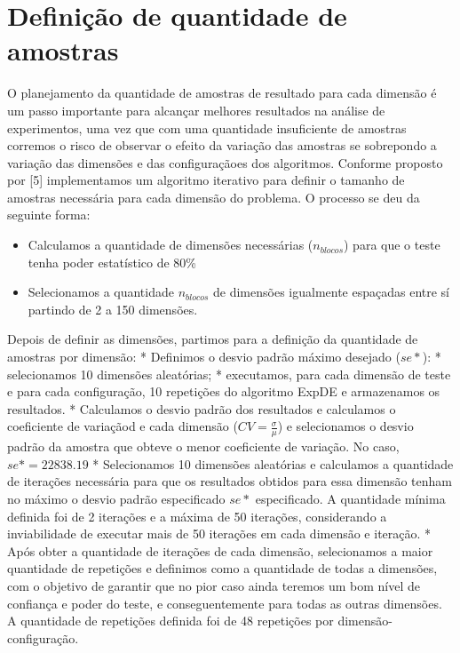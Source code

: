 \documentclass[
]{article}
\providecommand{\tightlist}{%
  \setlength{\itemsep}{0pt}\setlength{\parskip}{0pt}}
\begin{document}
\hypertarget{definiuxe7uxe3o-de-quantidade-de-amostras}{%
\section{Definição de quantidade de
amostras}\label{definiuxe7uxe3o-de-quantidade-de-amostras}}

O planejamento da quantidade de amostras de resultado para cada dimensão
é um passo importante para alcançar melhores resultados na análise de
experimentos, uma vez que com uma quantidade insuficiente de amostras
corremos o risco de observar o efeito da variação das amostras se
sobrepondo a variação das dimensões e das configuraçãoes dos algoritmos.
Conforme proposto por {[}5{]} implementamos um algoritmo iterativo para
definir o tamanho de amostras necessária para cada dimensão do problema.
O processo se deu da seguinte forma:

\begin{itemize}
\tightlist
\item
  Calculamos a quantidade de dimensões necessárias (\(n_{blocos}\)) para
  que o teste tenha poder estatístico de 80\%
\item
  Selecionamos a quantidade \(n_{blocos}\) de dimensões igualmente
  espaçadas entre sí partindo de 2 a 150 dimensões.
\end{itemize}

Depois de definir as dimensões, partimos para a definição da quantidade
de amostras por dimensão: * Definimos o desvio padrão máximo desejado
(\(se*\)): * selecionamos 10 dimensões aleatórias; * executamos, para
cada dimensão de teste e para cada configuração, 10 repetições do
algoritmo ExpDE e armazenamos os resultados. * Calculamos o desvio
padrão dos resultados e calculamos o coeficiente de variaçãod e cada
dimensão (\(CV = \frac{\sigma}{\mu}\)) e selecionamos o desvio padrão da
amostra que obteve o menor coeficiente de variação. No caso,
\(se*= 22838.19\) * Selecionamos 10 dimensões aleatórias e calculamos a
quantidade de iterações necessária para que os resultados obtidos para
essa dimensão tenham no máximo o desvio padrão especificado \(se*\)
especificado. A quantidade mínima definida foi de 2 iterações e a máxima
de 50 iterações, considerando a inviabilidade de executar mais de 50
iterações em cada dimensão e iteração. * Após obter a quantidade de
iterações de cada dimensão, selecionamos a maior quantidade de
repetições e definimos como a quantidade de todas a dimensões, com o
objetivo de garantir que no pior caso ainda teremos um bom nível de
confiança e poder do teste, e conseguentemente para todas as outras
dimensões. A quantidade de repetições definida foi de 48 repetições por
dimensão-configuração.
\end{document}

